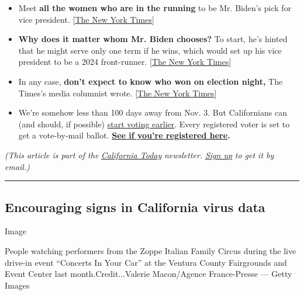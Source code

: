 \begin{itemize}
\item
  Meet \textbf{all the women who are in the running} to be Mr. Biden's
  pick for vice president.
  {[}\href{https://www.nytimes.com/interactive/2020/07/23/us/elections/vice-president-biden-kamala-harris-elizabeth-warren.html?}{The
  New York Times}{]}
\item
  \textbf{Why does it matter whom Mr. Biden chooses?} To start, he's
  hinted that he might serve only one term if he wins, which would set
  up his vice president to be a 2024 front-runner.
  {[}\href{https://www.nytimes.com/2020/05/03/us/politics/joe-biden-vice-president-pick.html?}{The
  New York Times}{]}
\item
  In any case, \textbf{don't expect to know who won on election night,}
  The Times's media columnist wrote.
  {[}\href{https://www.nytimes.com/2020/08/02/business/media/election-coverage.html?smid=tw-share}{The
  New York Times}{]}
\item
  We're somehow less than 100 days away from Nov. 3. But Californians
  can (and should, if possible)
  \href{https://www.nytimes.com/2020/04/10/us/california-mail-in-ballot-coronavirus.html}{start
  voting earlier}. Every registered voter is set to get a vote-by-mail
  ballot. \textbf{\href{https://voterstatus.sos.ca.gov/}{See if you're
  registered here}.}
\end{itemize}

\emph{(This article is part of the}
\href{https://www.nytimes.com/column/california-today}{\emph{California
Today}} \emph{newsletter.}
\href{https://www.nytimes.com/newsletters/california-today}{\emph{Sign
up}} \emph{to get it by email.)}

\begin{center}\rule{0.5\linewidth}{\linethickness}\end{center}

\hypertarget{encouraging-signs-in-california-virus-data}{%
\subsection{Encouraging signs in California virus
data}\label{encouraging-signs-in-california-virus-data}}

Image

People watching performers from the Zoppe Italian Family Circus during
the live drive-in event ``Concerts In Your Car'' at the Ventura County
Fairgrounds and Event Center last month.Credit...Valerie Macon/Agence
France-Presse --- Getty Images

